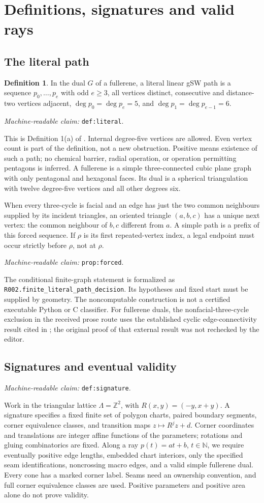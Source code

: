 \documentclass[11pt]{amsart}
\newcommand{\Z}{\mathbb Z}
\newcommand{\N}{\mathbb N}
\newcommand{\record}[1]{\nolinkurl{#1}}
\newcommand{\claimid}[1]{\par\nopagebreak\noindent\textit{Machine-readable claim:} \record{#1}.\par}
\theoremstyle{definition}\newtheorem{definition}{Definition}
\begin{document}
\section{Definitions, signatures and valid rays}\label{sec:definitions}
\subsection{The literal path}
\begin{definition}\label{def:literal}
In the dual $G$ of a fullerene, a literal linear gSW path is a sequence
$p_0,\ldots,p_e$ with odd $e\ge3$, all vertices distinct, consecutive
and distance-two vertices adjacent, $\deg p_0=\deg p_e=5$, and
$\deg p_1=\deg p_{e-1}=6$.
\end{definition}
\claimid{def:literal}
This is Definition 1(a) of \cite{BBS}. Internal degree-five vertices
are allowed. Even vertex count is part of the definition, not a new
obstruction. Positive means existence of such a path; no chemical
barrier, radial operation, or operation permitting pentagons is inferred.
A fullerene is a simple three-connected cubic plane graph with only
pentagonal and hexagonal faces. Its dual is a spherical triangulation
with twelve degree-five vertices and all other degrees six.

When every three-cycle is facial and an edge has just the two common
neighbours supplied by its incident triangles, an oriented triangle
$(a,b,c)$ has a unique next vertex: the common neighbour of $b,c$
different from $a$. A simple path is a prefix of this forced sequence.
If $\rho$ is its first repeated-vertex index, a legal endpoint must
occur strictly before $\rho$, not at $\rho$.
\label{prop:forced}\claimid{prop:forced}
The conditional finite-graph statement is formalized as
\record{R002.finite_literal_path_decision}. Its hypotheses and fixed
start must be supplied by geometry. The noncomputable construction
is not a certified executable Python or C classifier. For fullerene
duals, the nonfacial-three-cycle exclusion in the received prose route
uses the established cyclic edge-connectivity result cited in
\cite{Connectivity}; the original proof of that external result was
not rechecked by the editor.

\subsection{Signatures and eventual validity}\label{def:signature}
\claimid{def:signature}
Work in the triangular lattice $\Lambda=\Z^2$, with
$R(x,y)=(-y,x+y)$. A signature specifies a fixed finite set of polygon
charts, paired boundary segments, corner equivalence classes, and
transition maps $z\mapsto R^jz+d$. Corner coordinates and translations
are integer affine functions of the parameters; rotations and gluing
combinatorics are fixed. Along a ray $p(t)=at+b$, $t\in\N$, we require
eventually positive edge lengths, embedded chart interiors, only the
specified seam identifications, noncrossing macro edges, and a valid
simple fullerene dual. Every cone has a marked corner label. Seams
need an ownership convention, and full corner equivalence classes are
used. Positive parameters and positive area alone do not prove validity.
\end{document}
